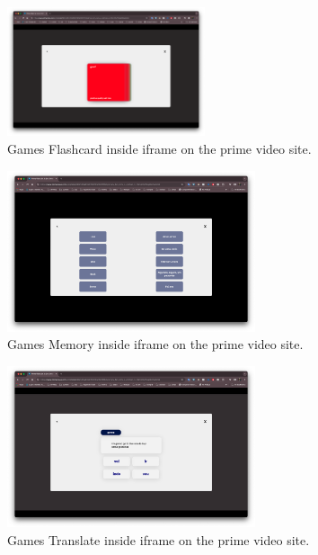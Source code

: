 \documentclass[12pt]{article}
\begin{document}

    \begin{figure}[!h]
      \centering
      \caption{
      Games Flashcard inside iframe on the prime video site.
      }
      \label{fig:iframe2}
      \includegraphics[width=0.52\textwidth]{assets/10.png}
    \end{figure}

    \begin{figure}[!h]
      \centering
      \caption{
      Games Memory inside iframe on the prime video site.
      }
      \label{fig:iframe3}
      \includegraphics[width=0.65\textwidth]{assets/11.png}
    \end{figure}

    \begin{figure}[!h]
      \centering
      \caption{
      Games Translate inside iframe on the prime video site.
      }
      \label{fig:iframe4}
      \includegraphics[width=0.65\textwidth]{assets/12.png}
    \end{figure}
\end{document}
